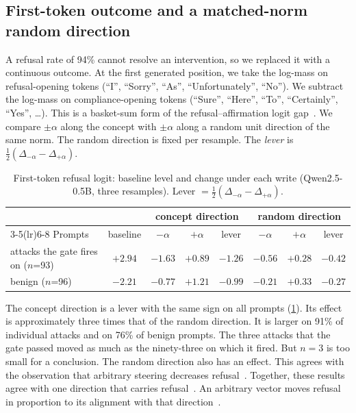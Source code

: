 \documentclass[11pt]{article}
\begin{document}
\subsection{First-token outcome and a matched-norm random direction}
\label{sec:lever}
A refusal rate of 94\% cannot resolve an intervention, so we replaced it with a continuous outcome. At
the first generated position, we take the log-mass on refusal-opening tokens (``I'', ``Sorry'', ``As'',
``Unfortunately'', ``No''). We subtract the log-mass on compliance-opening tokens (``Sure'', ``Here'',
``To'', ``Certainly'', ``Yes'', \ldots). This is a basket-sum form of the refusal--affirmation logit
gap~\citep{li2025logitgap}. We compare $\pm\alpha$ along the concept with $\pm\alpha$ along a random unit
direction of the same norm. The random direction is fixed per resample. The \emph{lever} is
$\tfrac12(\Delta_{-\alpha}-\Delta_{+\alpha})$.

\begin{table}[t]
\centering
\small
\caption{First-token refusal logit: baseline level and change under each write (Qwen2.5-0.5B, three
resamples). Lever $=\tfrac12(\Delta_{-\alpha}-\Delta_{+\alpha})$.}
\label{tab:lever}
\begin{tabular}{lccccccc}
\toprule
 & & \multicolumn{3}{c}{concept direction} & \multicolumn{3}{c}{random direction} \\
\cmidrule(lr){3-5}\cmidrule(lr){6-8}
Prompts & baseline & $-\alpha$ & $+\alpha$ & lever & $-\alpha$ & $+\alpha$ & lever \\
\midrule
attacks the gate fires on ($n$=93) & $+2.94$ & $-1.63$ & $+0.89$ & $\mathbf{-1.26}$ & $-0.56$ & $+0.28$ & $-0.42$ \\
benign ($n$=96) & $-2.21$ & $-0.77$ & $+1.21$ & $\mathbf{-0.99}$ & $-0.21$ & $+0.33$ & $-0.27$ \\
\bottomrule
\end{tabular}
\end{table}

The concept direction is a lever with the same sign on all prompts (\cref{tab:lever}). Its effect is
approximately three times that of the random direction. It is larger on 91\% of individual attacks and on
76\% of benign prompts. The three attacks that the gate passed moved as much as the ninety-three on which it
fired. But $n=3$ is too small for a conclusion. The random direction also has an effect. This agrees with
the observation that arbitrary steering decreases refusal~\citep{korznikov2025roguescalpel}. Together,
these results agree with one direction that carries refusal~\citep{arditi2024refusal}. An arbitrary vector
moves refusal in proportion to its alignment with that direction~\citep{li2026pitfalls}.
\end{document}
